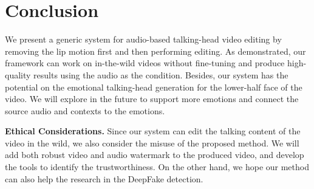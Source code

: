 \section{Conclusion}
We present a generic system for audio-based talking-head video editing by removing the lip motion first and then performing editing. As demonstrated, our framework can work on in-the-wild videos without fine-tuning and produce high-quality results using the audio as the condition. 
Besides, our system has the potential on the emotional talking-head generation for the lower-half face of the video. We will explore in the future to support more emotions and connect the source audio and contexts to the emotions. 

\textbf{Ethical Considerations.} Since our system can edit the talking content of the video in the wild, we also consider the misuse of the proposed method.
We will add both robust video and audio watermark to the produced video, and develop the tools to identify the trustworthiness. On the other hand, we hope our method can also help the research in the DeepFake detection. 


